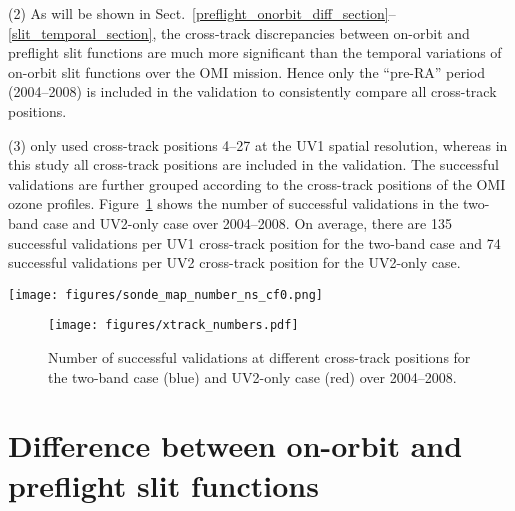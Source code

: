 \documentclass[amt,manuscript]{copernicus}
\begin{document}
(2) As will be shown in Sect.~\ref{preflight_onorbit_diff_section}--\ref{slit_temporal_section}, the cross-track discrepancies between on-orbit and preflight slit functions are much more significant than the temporal variations of on-orbit slit functions over the OMI mission. Hence only the ``pre-RA'' period (2004--2008) is included in the validation to consistently compare all cross-track positions.

(3) \citet{huang2017} only used cross-track positions 4--27 at the UV1 spatial resolution, whereas in this study all cross-track positions are included in the validation. The successful validations are further grouped according to the cross-track positions of the OMI ozone profiles. Figure~\ref{xtrack_numbers} shows the number of successful validations in the two-band case and UV2-only case over 2004--2008. On average, there are 135 successful validations per UV1 cross-track position for the two-band case and 74 successful validations per UV2 cross-track position for the UV2-only case.

\begin{figure*}[tbhp]
\texttt{[image: figures/sonde\_map\_number\_ns\_cf0.png]}
\caption{The locations of the ozonesondes used in this study. The size of circles denotes the number of successful validations for the two-band case in 2004--2008, and the color denotes mean bias between the tropospheric ozone column from OMI and the ozonesonde convolved with the OMI AK.}
\label{sonde_map}
\end{figure*}

\begin{figure}[t]
\texttt{[image: figures/xtrack\_numbers.pdf]}
\caption{Number of successful validations at different cross-track positions for the two-band case (blue) and UV2-only case (red) over 2004--2008.}
\label{xtrack_numbers}
\end{figure}

\section{Difference between on-orbit and preflight slit functions\label{preflight_onorbit_diff_section}}
\end{document}
